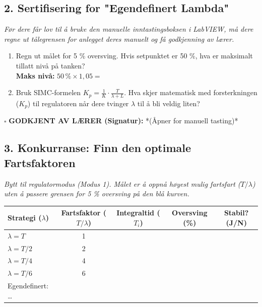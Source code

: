 \documentclass[a4paper,11pt]{article}
\begin{document}
\subsection*{2. Sertifisering for "Egendefinert Lambda"}
\textit{Før dere får lov til å bruke den manuelle inntastingsboksen i LabVIEW, må dere regne ut tålegrensen for anlegget deres manuelt og få godkjenning av lærer.}
\begin{enumerate}
    \item Regn ut målet for 5 \% oversving. Hvis setpunktet er 50 \%, hva er maksimalt tillatt nivå på tanken? \\
    \textbf{Maks nivå:} $50\,\% \times 1,05 = $ \underline{\hspace{3cm}}
    \item Bruk SIMC-formelen $K_p = \frac{1}{K} \cdot \frac{T}{\lambda + L}$. Hva skjer matematisk med forsterkningen ($K_p$) til regulatoren når dere tvinger $\lambda$ til å bli veldig liten? \\
    \hrulefill
\end{enumerate}
$\square$ \textbf{GODKJENT AV LÆRER (Signatur):} \underline{\hspace{4cm}} *(Åpner for manuell tasting)*

\newpage

\subsection*{3. Konkurranse: Finn den optimale Fartsfaktoren}
\textit{Bytt til regulatormodus (Modus 1). Målet er å oppnå høyest mulig fartsfart ($T/\lambda$) uten å passere grensen for 5 \% oversving på den blå kurven.}

\begin{table}[h]
\centering
\begin{tabular}{@{}lcccc@{}}
\toprule
\textbf{Strategi ($\lambda$)} & \textbf{Fartsfaktor ($T/\lambda$)} & \textbf{Integraltid ($T_i$)} & \textbf{Oversving (\%)} & \textbf{Stabil? (J/N)} \\ \midrule
$\lambda = T$                 & 1                                  &                              &                         &                        \\
$\lambda = T/2$               & 2                                  &                              &                         &                        \\
$\lambda = T/4$               & 4                                  &                              &                         &                        \\
$\lambda = T/6$               & 6                                  &                              &                         &                        \\
Egendefinert: \dots           &                                    &                              &                         &                        \\ \bottomrule
\end{tabular}
\end{table}
\end{document}
